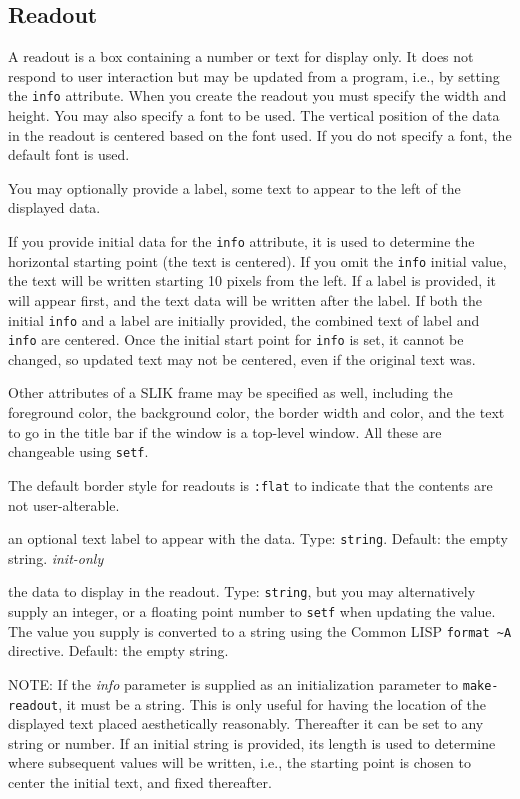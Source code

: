 \documentclass[twoside,openright,11pt]{report}
\newcommand{\tp}[1]{\texttt{#1}}
\begin{document}
\subsection{Readout}

A readout is a box containing a number or text for display only.  It
does not respond to user interaction but may be updated from a
program, i.e., by setting the \tp{info} attribute.  When you create
the readout you must specify the width and height.  You may also
specify a font to be used.  The vertical position of the data in the
readout is centered based on the font used.  If you do not specify a
font, the default font is used.

You may optionally provide a label, some text to appear to the left of
the displayed data.

If you provide initial data for the \tp{info} attribute, it is used to
determine the horizontal starting point (the text is centered).  If
you omit the \tp{info} initial value, the text will be written
starting 10 pixels from the left.  If a label is provided, it will
appear first, and the text data will be written after the label.  If
both the initial \tp{info} and a label are initially provided, the
combined text of label and \tp{info} are centered.  Once the initial
start point for \tp{info} is set, it cannot be changed, so updated
text may not be centered, even if the original text was.

Other attributes of a SLIK frame may be specified as well, including
the foreground color, the background color, the border width and
color, and the text to go in the title bar if the window is a
top-level window.  All these are changeable using \tp{setf}.

The default border style for readouts is \tp{:flat} to indicate that
the contents are not user-alterable.


{an optional text label to appear with the data.  Type:
\tp{string}. Default: the empty string.  \textit{init-only}}

{the data to display in the readout.  Type: \tp{string}, but you
may alternatively supply an integer, or a floating point number to
\tp{setf} when updating the value.  The value you supply is
converted to a string using the Common LISP \tp{format \~{}A}
directive.  Default: the empty string.}

NOTE: If the \emph{info} parameter is supplied as an initialization
parameter to \tp{make-readout}, it must be a string.  This is only
useful for having the location of the displayed text placed
aesthetically reasonably.  Thereafter it can be set to any string or
number.  If an initial string is provided, its length is used to
determine where subsequent values will be written, i.e., the starting
point is chosen to center the initial text, and fixed thereafter.
\end{document}
